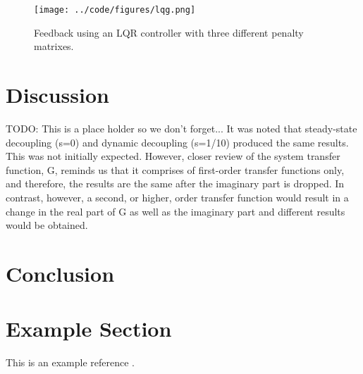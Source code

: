 \documentclass[a4paper, titlepage]{article}
\begin{document}
\begin{figure}[H]
\center
\texttt{[image: ../code/figures/lqg.png]}
\caption{Feedback using an LQR controller with three different penalty matrixes.}
\label{fig:lqgControl}
\end{figure}


\section{Discussion}

TODO: This is a place holder so we don't forget...
It was noted that steady-state decoupling (s=0) and dynamic decoupling (s=1/10) produced the same results.  This was not initially expected.  However, closer review of the system transfer function, G, reminds us that it comprises of first-order transfer functions only, and therefore, the results are the same after the imaginary part is dropped.  In contrast, however, a second, or higher, order transfer function would result in a change in the real part of G as well as the imaginary part and different results would be obtained.

\section{Conclusion}

\clearpage


\clearpage
\appendix

\section{Example Section}
This is an example reference \citep{glad00}.



\end{document}
